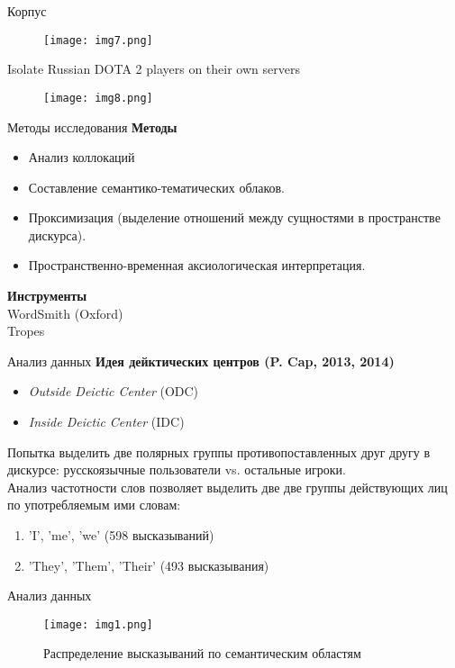 \documentclass{beamer}
\begin{document}
\begin{frame}{Корпус}
	\begin{figure}
		\texttt{[image: img7.png]}
	\end{figure}
\end{frame}

\begin{frame}{Isolate Russian DOTA 2 players on their own servers}
	\begin{figure}
		\texttt{[image: img8.png]}
	\end{figure}
\end{frame}

\begin{frame}{Методы исследования}
	\textbf{Методы} 
	\begin{itemize}
		\item Анализ коллокаций
		\item Составление семантико-тематических облаков.
		\item Проксимизация (выделение отношений между сущностями в пространстве дискурса). 
		\item Пространственно-временная аксиологическая интерпретация.
	\end{itemize}
	\textbf{Инструменты}\\
	WordSmith (Oxford)\\
	Tropes
\end{frame}

\begin{frame}{Анализ данных}
	\textbf{Идея дейктических центров (P. Cap, 2013, 2014)}
	\begin{itemize}
		\item \textit{Outside Deictic Center} (ODC)
		\item  \textit{Inside Deictic Center} (IDC) 
	\end{itemize}
	Попытка выделить две полярных группы противопоставленных друг другу в дискурсе: русскоязычные пользователи vs. остальные игроки. \\
	Анализ частотности слов позволяет выделить две две группы действующих лиц по употребляемым ими словам: \\
	\begin{enumerate}
		\item 'I', 'me', 'we' (598 высказываний)
		\item 'They', 'Them', 'Their' (493 высказывания)
	\end{enumerate}
\end{frame}

\begin{frame}{Анализ данных}
	\begin{figure}
		\caption{Распределение высказываний по семантическим областям}
		\texttt{[image: img1.png]}
	\end{figure}
\end{frame}
\end{document}
